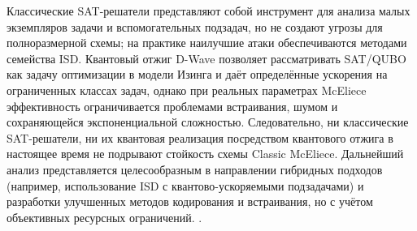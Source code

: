 Классические SAT-решатели представляют собой инструмент для анализа малых экземпляров задачи и вспомогательных подзадач, но не создают угрозы для полноразмерной схемы; на практике наилучшие атаки обеспечиваются методами семейства ISD. Квантовый отжиг D-Wave позволяет рассматривать SAT/QUBO как задачу оптимизации в модели Изинга и даёт определённые ускорения на ограниченных классах задач, однако при реальных параметрах McEliece эффективность ограничивается проблемами встраивания, шумом и сохраняющейся экспоненциальной сложностью. Следовательно, ни классические SAT-решатели, ни их квантовая реализация посредством квантового отжига в настоящее время не подрывают стойкость схемы Classic McEliece. Дальнейший анализ представляется целесообразным в направлении гибридных подходов (например, использование ISD с квантово-ускоряемыми подзадачами) и разработки улучшенных методов кодирования и встраивания, но с учётом объективных ресурсных ограничений.
\cite{ClassicMcEliece2020,Shintaro2024}.
